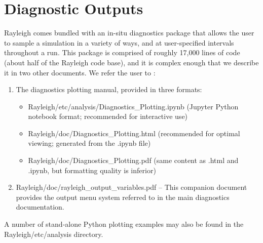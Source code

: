 \section{Diagnostic Outputs}\label{sec:diagnostics}

Rayleigh comes bundled with an in-situ diagnostics package that allows the user to sample a simulation in a variety of ways, and at user-specified intervals throughout a run.  This package is comprised of roughly 17,000 lines of code (about half of the Rayleigh code base), and it is complex enough that we describe it in two other documents.  We refer the user to :
\begin{enumerate}
\item The diagnostics plotting manual, provided in three formats:
    \begin{itemize}
    \item Rayleigh/etc/analysis/Diagnostics\_Plotting.ipynb (Jupyter Python notebook format; recommended for interactive use)
    \item Rayleigh/doc/Diagnostics\_Plotting.html  (recommended for optimal viewing; generated from the .ipynb file)
    \item Rayleigh/doc/Diagnostics\_Plotting.pdf   (same content as .html and .ipynb, but formatting quality is inferior)
    \end{itemize}
\item Rayleigh/doc/rayleigh\_output\_variables.pdf --  This companion document provides the output menu system referred to in the main diagnostics documentation.
\end{enumerate}

A number of stand-alone Python plotting examples may also be found in the Rayleigh/etc/analysis directory.

